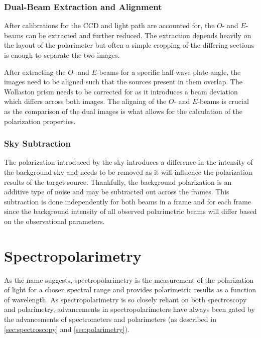\subsubsection{Dual-Beam Extraction and Alignment} \label{subsubsec:pol_oe_extract}

After calibrations for the \gls{CCD} and light path are accounted for, the $O$- and $E$-beams can be extracted and further reduced. The extraction depends heavily on the layout of the polarimeter but often a simple cropping of the differing sections is enough to separate the two images.

After extracting the $O$- and $E$-beams for a specific half-wave plate angle, the images need to be aligned such that the sources present in them overlap. The Wollaston prism needs to be corrected for as it introduces a beam deviation which differs across both images. The aligning of the $O$- and $E$-beams is crucial as the comparison of the dual images is what allows for the calculation of the polarization properties.

\subsubsection{Sky Subtraction} \label{subsubsec:pol_sky_subtract}

The polarization introduced by the sky introduces a difference in the intensity of the background sky and needs to be removed as it will influence the polarization results of the target source. Thankfully, the background polarization is an additive type of noise and may be subtracted out across the frames. This subtraction is done independently for both beams in a frame and for each frame since the background intensity of all observed polarimetric beams will differ based on the observational parameters.

\section{Spectropolarimetry} \label{sec:spectropolarimetry} %

As the name suggests, spectropolarimetry is the measurement of the polarization of light for a chosen spectral range and provides polarimetric results as a function of wavelength. As spectropolarimetry is so closely reliant on both spectroscopy and polarimetry, advancements in spectropolarimeters have always been gated by the advancements of spectrometers and polarimeters (as described in \autoref{sec:spectroscopy} and \autoref{sec:polarimetry}).

